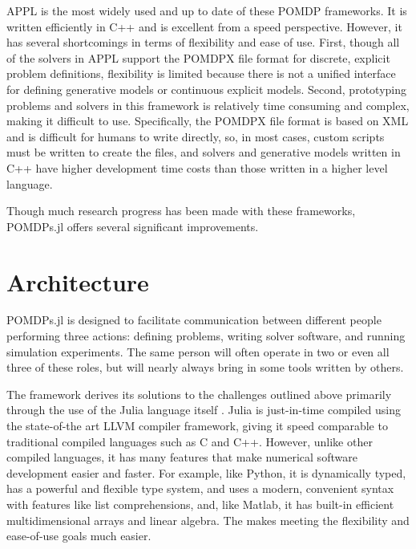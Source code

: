 APPL is the most widely used and up to date of these POMDP frameworks.
It is written efficiently in C++ and is excellent from a speed perspective.
However, it has several shortcomings in terms of flexibility and ease of use.
First, though all of the solvers in APPL support the POMDPX file format for discrete, explicit problem definitions, flexibility is limited because there is not a unified interface for defining generative models or continuous explicit models.
Second, prototyping problems and solvers in this framework is relatively time consuming and complex, making it difficult to use.
Specifically, the POMDPX file format is based on XML and is difficult for humans to write directly, so, in most cases, custom scripts must be written to create the files, and solvers and generative models written in C++ have higher development time costs than those written in a higher level language.


Though much research progress has been made with these frameworks, POMDPs.jl offers several significant improvements.

\section{Architecture}

POMDPs.jl is designed to facilitate communication between different people performing three actions: defining problems, writing solver software, and running simulation experiments.
The same person will often operate in two or even all three of these roles, but will nearly always bring in some tools written by others.

The framework derives its solutions to the challenges outlined above primarily through the use of the Julia language itself \cite{bezanson2017julia}.
Julia is just-in-time compiled using the state-of-the art LLVM compiler framework, giving it speed comparable to traditional compiled languages such as C and C++.
However, unlike other compiled languages, it has many features that make numerical software development easier and faster.
For example, like Python, it is dynamically typed, has a powerful and flexible type system, and uses a modern, convenient syntax with features like list comprehensions, and, like Matlab, it has built-in efficient multidimensional arrays and linear algebra.
The makes meeting the flexibility and ease-of-use goals much easier.

